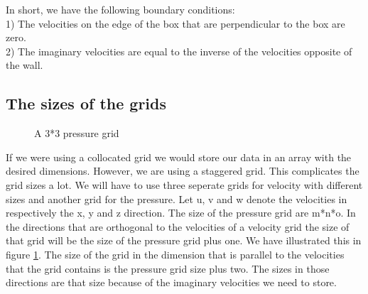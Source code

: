 \documentclass{article}
\begin{document}
In short, we have the following boundary conditions: \\
1) The velocities on the edge of the box that are perpendicular to the box are zero.\\
2) The imaginary velocities are equal to the inverse of the velocities opposite of the wall.

\newpage
\subsection{The sizes of the grids}
\begin{figure}[ht]
\centering
\caption{A 3*3 pressure grid}
\label{grid sizes}
\end{figure}

If we were using a collocated grid we would store our data in an array with the desired dimensions. However, we are using a staggered grid. This complicates the grid sizes a lot. We will have to use three seperate grids for velocity with different sizes and another grid for the pressure. Let u, v and w denote the velocities in respectively the x, y and z direction. The size of the pressure grid are m*n*o. In the directions that are orthogonal to the velocities of a velocity grid the size of that grid will be the size of the pressure grid plus one. We have illustrated this in figure \ref{grid sizes}. The size of the grid in the dimension that is parallel to the velocities that the grid contains is the pressure grid size plus two. The sizes in those directions are that size because of the imaginary velocities we need to store.

\newpage
\end{document}
